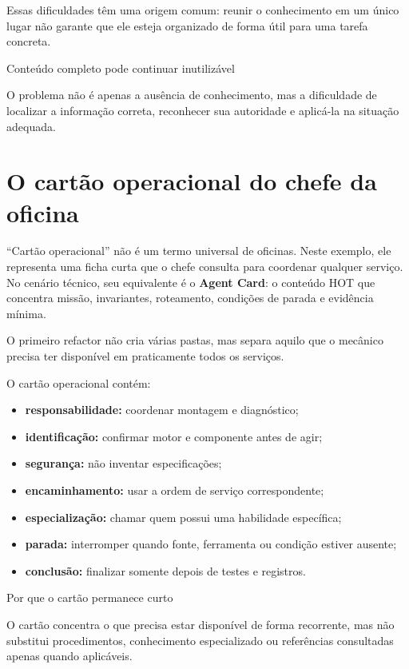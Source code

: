 \documentclass[
  10pt,
  a4paper,
  oneside]{book}
\providecommand{\tightlist}{%
  \setlength{\itemsep}{0pt}\setlength{\parskip}{0pt}}
\begin{document}
Essas dificuldades têm uma origem comum: reunir o conhecimento em um
único lugar não garante que ele esteja organizado de forma útil para uma
tarefa concreta.

\begin{warningbox}{Conteúdo completo pode continuar inutilizável}

O problema não é apenas a ausência de conhecimento, mas a dificuldade de
localizar a informação correta, reconhecer sua autoridade e aplicá-la na
situação adequada.

\end{warningbox}

\hypertarget{o-cartuxe3o-operacional-do-chefe-da-oficina}{%
\section{O cartão operacional do chefe da
oficina}\label{o-cartuxe3o-operacional-do-chefe-da-oficina}}

``Cartão operacional'' não é um termo universal de oficinas. Neste
exemplo, ele representa uma ficha curta que o chefe consulta para
coordenar qualquer serviço. No cenário técnico, seu equivalente é o
\textbf{Agent Card}: o conteúdo HOT que concentra missão, invariantes,
roteamento, condições de parada e evidência mínima.

O primeiro refactor não cria várias pastas, mas separa aquilo que o
mecânico precisa ter disponível em praticamente todos os serviços.

O cartão operacional contém:

\begin{itemize}
\tightlist
\item
  \textbf{responsabilidade:} coordenar montagem e diagnóstico;
\item
  \textbf{identificação:} confirmar motor e componente antes de agir;
\item
  \textbf{segurança:} não inventar especificações;
\item
  \textbf{encaminhamento:} usar a ordem de serviço correspondente;
\item
  \textbf{especialização:} chamar quem possui uma habilidade específica;
\item
  \textbf{parada:} interromper quando fonte, ferramenta ou condição
  estiver ausente;
\item
  \textbf{conclusão:} finalizar somente depois de testes e registros.
\end{itemize}

\begin{infobox}{Por que o cartão permanece curto}

O cartão concentra o que precisa estar disponível de forma recorrente,
mas não substitui procedimentos, conhecimento especializado ou
referências consultadas apenas quando aplicáveis.

\end{infobox}
\end{document}
